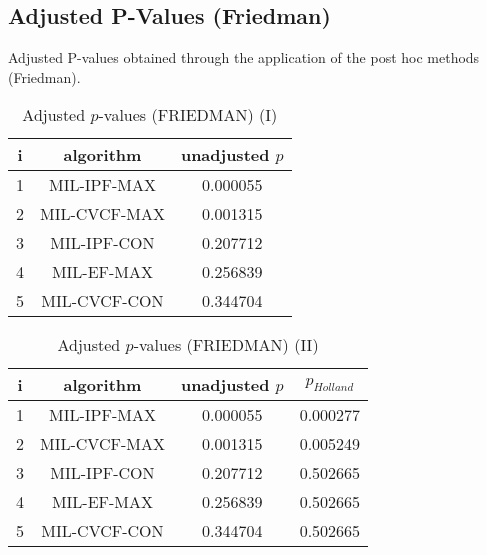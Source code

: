 \documentclass[a4paper,10pt]{article}
\begin{document}
\begin{landscape}
\newpage

\section{Adjusted P-Values (Friedman)}


Adjusted P-values obtained through the application of the post hoc methods (Friedman).

\begin{table}[!htp]
\centering\small
\begin{tabular}{ccc}
i&algorithm&unadjusted $p$\\
\hline1&MIL-IPF-MAX&0.000055\\2&MIL-CVCF-MAX&0.001315\\3&MIL-IPF-CON&0.207712\\4&MIL-EF-MAX&0.256839\\5&MIL-CVCF-CON&0.344704\\\hline
\end{tabular}
\caption{Adjusted $p$-values (FRIEDMAN) (I)}
\end{table}
\begin{table}[!htp]
\centering\small
\begin{tabular}{cccc}
i&algorithm&unadjusted $p$&$p_{Holland}$\\
\hline1&MIL-IPF-MAX&0.000055&0.000277\\2&MIL-CVCF-MAX&0.001315&0.005249\\3&MIL-IPF-CON&0.207712&0.502665\\4&MIL-EF-MAX&0.256839&0.502665\\5&MIL-CVCF-CON&0.344704&0.502665\\\hline
\end{tabular}
\caption{Adjusted $p$-values (FRIEDMAN) (II)}
\end{table}

\newpage
\end{landscape}
\end{document}
